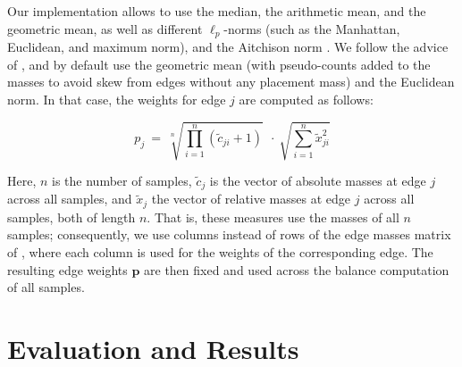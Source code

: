 Our implementation allows to use the median, the arithmetic mean, and the geometric mean,
as well as different $\ell_p$-norms (such as the Manhattan, Euclidean, and maximum norm),
and the Aitchison norm \cite{Pawlowsky-Glahn2015}.
We follow the advice of \cite{Silverman2017}, and by default use the geometric mean
(with pseudo-counts added to the masses to avoid skew from edges without any placement mass) and the Euclidean norm.
In that case, the weights for edge $j$ are computed as follows:

\begin{equation*}
    \label{ch:MaterialsMethods:sec:Balances:eq:EdgeWeights}
    p_j ~=~ \sqrt[n]{ \prod_{i=1}^{n} ( \tilde{c}_{ji} + 1 ) }  ~~\cdot~  \sqrt{ \sum_{i=1}^{n} \tilde{x}_{ji}^2 }
\end{equation*}

Here, $n$ is the number of samples, $\tilde{c}_j$ is the vector of absolute masses at edge $j$ across all samples,
and $\tilde{x}_j$ the vector of relative masses at edge $j$ across all samples, both of length $n$.
That is, these measures use the masses of all $n$ samples;
consequently, we use columns instead of rows of the edge masses matrix of ,
where each column is used for the weights of the corresponding edge.
The resulting edge weights $\bm{p}$ are then fixed and used across the balance computation of all samples.



\section{Evaluation and Results}
\label{ch:Balances:sec:Results}

